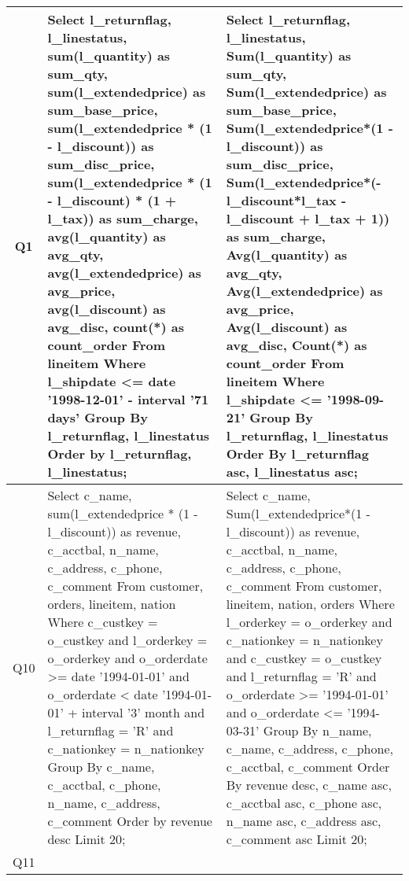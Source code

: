 \onecolumn
\begin{center}
\tablehead{\hline}
\tabletail{\hline}
\tablelasttail{\hline}
\begin{supertabular}{|c|p{7cm}|p{7cm}|}\hline\footnotesize{Q1} &
\footnotesize{Select l\_returnflag, l\_linestatus, sum(l\_quantity) as sum\_qty, sum(l\_extendedprice) as  sum\_base\_price, sum(l\_extendedprice * (1 - l\_discount)) as sum\_disc\_price, sum(l\_extendedprice * (1 - l\_discount) * (1 + l\_tax)) as sum\_charge, avg(l\_quantity) as avg\_qty, avg(l\_extendedprice) as  avg\_price, avg(l\_discount) as avg\_disc, count(*) as count\_order From lineitem Where l\_shipdate <= date '1998-12-01' - interval '71 days' Group By l\_returnflag, l\_linestatus Order by l\_returnflag, l\_linestatus;} &
\footnotesize{Select l\_returnflag, l\_linestatus, Sum(l\_quantity) as sum\_qty, Sum(l\_extendedprice) as sum\_base\_price, Sum(l\_extendedprice*(1 - l\_discount)) as sum\_disc\_price, Sum(l\_extendedprice*(-l\_discount*l\_tax - l\_discount + l\_tax + 1)) as sum\_charge, Avg(l\_quantity) as avg\_qty, Avg(l\_extendedprice) as avg\_price, Avg(l\_discount) as avg\_disc, Count(*) as count\_order  From lineitem   Where l\_shipdate  <= '1998-09-21'   Group By l\_returnflag, l\_linestatus   Order By l\_returnflag asc, l\_linestatus asc;} \\\hline\footnotesize{Q10} &
\footnotesize{Select c\_name, sum(l\_extendedprice * (1 - l\_discount)) as revenue, c\_acctbal, n\_name, c\_address,         c\_phone, c\_comment From customer, orders, lineitem, nation         Where c\_custkey = o\_custkey and l\_orderkey = o\_orderkey and o\_orderdate >= date '1994-01-01'         and o\_orderdate < date '1994-01-01' + interval '3' month and l\_returnflag = 'R' and c\_nationkey = n\_nationkey         Group By c\_name, c\_acctbal, c\_phone, n\_name, c\_address, c\_comment Order by revenue desc Limit 20;} &
\footnotesize{Select c\_name, Sum(l\_extendedprice*(1 - l\_discount)) as revenue, c\_acctbal, n\_name, c\_address, c\_phone, c\_comment  From customer, lineitem, nation, orders   Where l\_orderkey = o\_orderkey  and c\_nationkey = n\_nationkey  and c\_custkey = o\_custkey  and l\_returnflag = 'R'  and o\_orderdate  >= '1994-01-01' and o\_orderdate <= '1994-03-31'   Group By n\_name, c\_name, c\_address, c\_phone, c\_acctbal, c\_comment   Order By revenue desc, c\_name asc, c\_acctbal asc, c\_phone asc, n\_name asc, c\_address asc, c\_comment asc   Limit 20;} \\\hline\footnotesize{Q11} &

\end{supertabular}
\end{center}
